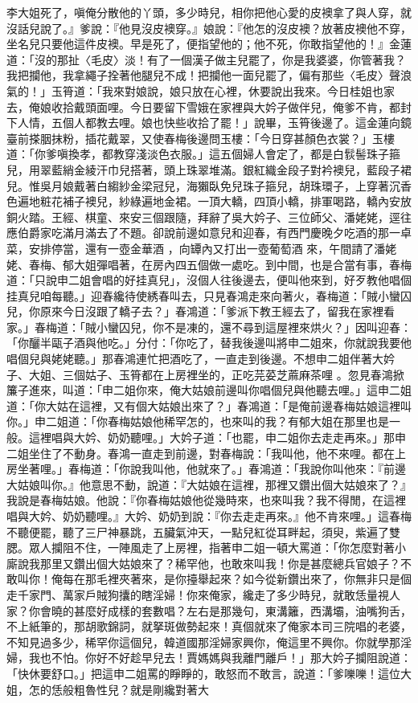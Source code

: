 李大姐死了，嗔俺分散他的丫頭，多少時兒，相你把他心愛的皮襖拿了與人穿，就沒話兒說了。』爹說：『他見沒皮襖穿。』娘說：『他怎的沒皮襖？放著皮襖他不穿，坐名兒只要他這件皮襖。早是死了，便指望他的；他不死，你敢指望他的！』金蓮道：「沒的那扯〈毛皮〉淡！有了一個漢子做主兒罷了，你是我婆婆，你管著我？我把攔他，我拿繩子拴著他腿兒不成！把攔他一面兒罷了，偏有那些〈毛皮〉聲浪氣的！」玉筲道：「我來對娘說，娘只放在心裡，休要說出我來。今日桂姐也家去，俺娘收拾戴頭面哩。今日要留下雪娥在家裡與大妗子做伴兒，俺爹不肯，都封下人情，五個人都教去哩。娘也快些收拾了罷！」說畢，玉筲後邊了。這金蓮向鏡臺前搽胭抹粉，插花戴翠，又使春梅後邊問玉樓：「今日穿甚顏色衣裳？」玉樓道：「你爹嗔換孝，都教穿淺淡色衣服。」這五個婦人會定了，都是白䯼髻珠子箍兒，用翠藍綃金綾汗巾兒搭著，頭上珠翠堆滿。銀紅織金段子對衿襖兒，藍段子裙兒。惟吳月娘戴著白縐紗金梁冠兒，海獺臥免兒珠子箍兒，胡珠環子，上穿著沉香色遍地粧花補子襖兒，紗綠遍地金裙。一頂大轎，四頂小轎，排軍喝路，轎內安放銅火踏。王經、棋童、來安三個跟隨，拜辭了吳大妗子、三位師父、潘姥姥，逕往應伯爵家吃滿月滿去了不題。卻說前邊如意兒和迎春，有西門慶晚夕吃酒的那一卓菜，安排停當，還有一壺金華酒 ，向罈內又打出一壺葡萄酒 來，午間請了潘姥姥、春梅、郁大姐彈唱著，在房內四五個做一處吃。到中間，也是合當有事，春梅道：「只說申二姐會唱的好挂真兒」，沒個人往後邊去，便叫他來到，好歹教他唱個挂真兒咱每聽。」迎春纔待使綉春叫去，只見春鴻走來向著火，春梅道：「賊小蠻囚兒，你原來今日沒跟了轎子去？」春鴻道：「爹派下教王經去了，留我在家裡看家。」春梅道：「賊小蠻囚兒，你不是凍的，還不尋到這屋裡來烘火？」因叫迎春：「你釃半甌子酒與他吃。」分付：「你吃了，替我後邊叫將申二姐來，你就說我要他唱個兒與姥姥聽。」那春鴻連忙把酒吃了，一直走到後邊。不想申二姐伴著大妗子、大姐、三個姑子、玉筲都在上房裡坐的，正吃芫荽芝蔴麻茶哩 。忽見春鴻掀簾子進來，叫道：「申二姐你來，俺大姑娘前邊叫你唱個兒與他聽去哩。」這申二姐道：「你大姑在這裡，又有個大姑娘出來了？」春鴻道：「是俺前邊春梅姑娘這裡叫你。」申二姐道：「你春梅姑娘他稀罕怎的，也來叫的我？有郁大姐在那里也是一般。這裡唱與大妗、奶奶聽哩。」大妗子道：「也罷，申二姐你去走走再來。」那申二姐坐住了不動身。春鴻一直走到前邊，對春梅說：「我叫他，他不來哩。都在上房坐著哩。」春梅道：「你說我叫他，他就來了。」春鴻道：「我說你叫他來：『前邊大姑娘叫你。』他意思不動，說道：『大姑娘在這裡，那裡又鑽出個大姑娘來了？』我說是春梅姑娘。他說：『你春梅姑娘他從幾時來，也來叫我？我不得閒，在這裡唱與大妗、奶奶聽哩。』大妗、奶奶到說：『你去走走再來。』他不肯來哩。」這春梅不聽便罷，聽了三尸神暴跳，五臟氣沖天，一點兒紅從耳畔起，須臾，紫遍了雙腮。眾人攔阻不住，一陣風走了上房裡，指著申二姐一頓大罵道：「你怎麼對著小廝說我那里又鑽出個大姑娘來了？稀罕他，也敢來叫我！你是甚麼總兵官娘子？不敢叫你！俺每在那毛裡夾著來，是你擡舉起來？如今從新鑽出來了，你無非只是個走千家門、萬家戶賊狗攮的瞎淫婦！你來俺家，纔走了多少時兒，就敢恁量視人家？你會曉的甚麼好成樣的套數唱？左右是那幾句，東溝籬，西溝壩，油嘴狗舌，不上紙筆的，那胡歌錦詞，就拏斑做勢起來！真個就來了俺家本司三院唱的老婆，不知見過多少，稀罕你這個兒，韓道國那淫婦家興你，俺這里不興你。你就學那淫婦，我也不怕。你好不好趁早兒去！賈媽媽與我離門離戶！」那大妗子攔阻說道：「快休要舒口。」把這申二姐罵的睜睜的，敢怒而不敢言，說道：「爹嚛嚛！這位大姐，怎的恁般粗魯性兒？就是剛纔對著大